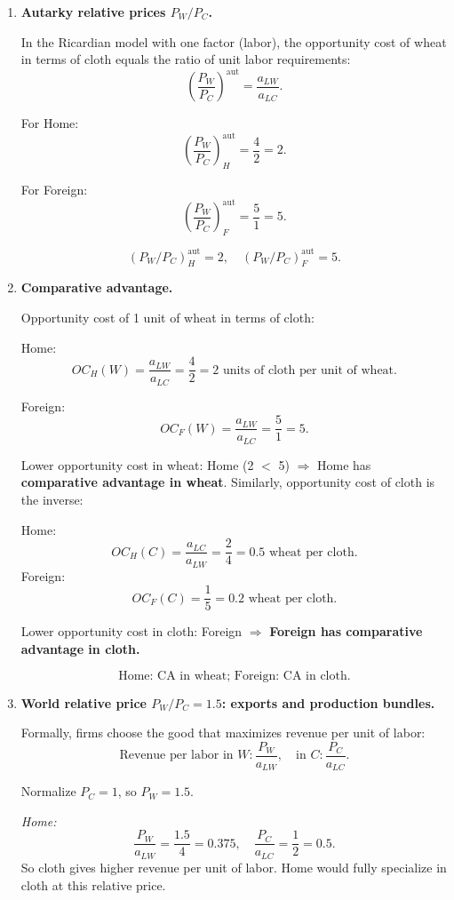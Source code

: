 \documentclass[12pt]{article}
\begin{document}
\begin{enumerate}[label=(\arabic*)]

\item \textbf{Autarky relative prices $P_W/P_C$.}

In the Ricardian model with one factor (labor), the opportunity cost of wheat in terms of cloth equals the ratio of unit labor requirements:
\[
\left(\frac{P_W}{P_C}\right)^{\text{aut}} = \frac{a_{LW}}{a_{LC}}.
\]

For Home:
\[
\left(\frac{P_W}{P_C}\right)_H^{\text{aut}} = \frac{4}{2} = 2.
\]

For Foreign:
\[
\left(\frac{P_W}{P_C}\right)_F^{\text{aut}} = \frac{5}{1} = 5.
\]

\[
\boxed{\left(P_W/P_C\right)_H^{\text{aut}} = 2,\quad \left(P_W/P_C\right)_F^{\text{aut}} = 5.}
\]

\item \textbf{Comparative advantage.}

Opportunity cost of 1 unit of wheat in terms of cloth:

Home:
\[
OC_H(W) = \frac{a_{LW}}{a_{LC}} = \frac{4}{2} = 2 \text{ units of cloth per unit of wheat.}
\]

Foreign:
\[
OC_F(W) = \frac{a_{LW}}{a_{LC}} = \frac{5}{1} = 5.
\]

Lower opportunity cost in wheat: Home (2 $<$ 5) $\Rightarrow$ Home has \textbf{comparative advantage in wheat}.  
Similarly, opportunity cost of cloth is the inverse:

Home:
\[
OC_H(C) = \frac{a_{LC}}{a_{LW}} = \frac{2}{4} = 0.5 \text{ wheat per cloth.}
\]
Foreign:
\[
OC_F(C) = \frac{1}{5} = 0.2 \text{ wheat per cloth.}
\]

Lower opportunity cost in cloth: Foreign $\Rightarrow$ \textbf{Foreign has comparative advantage in cloth.}

\[
\boxed{\text{Home: CA in wheat; Foreign: CA in cloth.}}
\]

\item \textbf{World relative price $P_W/P_C = 1.5$: exports and production bundles.}

Formally, firms choose the good that maximizes revenue per unit of labor:
\[
\text{Revenue per labor in } W: \frac{P_W}{a_{LW}},\quad
\text{in } C: \frac{P_C}{a_{LC}}.
\]

Normalize $P_C = 1$, so $P_W = 1.5$.

\emph{Home:}
\[
\frac{P_W}{a_{LW}} = \frac{1.5}{4} = 0.375, \quad 
\frac{P_C}{a_{LC}} = \frac{1}{2} = 0.5.
\]
So cloth gives higher revenue per unit of labor. Home would fully specialize in cloth at this relative price.


\end{enumerate}
\end{document}
